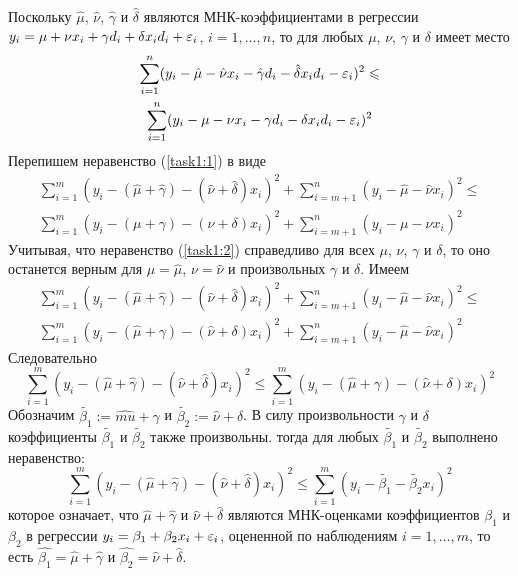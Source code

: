 \documentclass[pdftex,11pt,openany]{book}\usepackage[]{graphicx}\usepackage[]{color}
\begin{document}
\begin{solution}
Поскольку $\hat{\mu}$, $\hat{\nu}$, $\hat{\gamma}$ и $\hat{\delta}$ являются МНК-коэффициентами в регрессии $y_i = \mu + \nu x_i + \gamma d_i + \delta x_i d_i + \varepsilon_i$, $i = 1, \ldots, n$, то для любых $\mu$, $\nu$, $\gamma$ и $\delta$ имеет место
\begin{multline}
\label{task1:1}\sum_{i=1}^n (y_i - \hat{\mu} - \hat{\nu} x_i - \hat{\gamma} d_i - \hat{\delta} x_i d_i - \varepsilon_i)^2 \leqslant \\
\sum_{i=1}^n (y_i - \mu - \nu x_i - \gamma d_i - \delta x_i d_i - \varepsilon_i)^2
\end{multline}
Перепишем неравенство (\ref{task1:1}) в виде
\begin{multline}
\label{task1:2}\sum_{i=1}^m (y_i - (\hat{\mu} + \hat{\gamma}) - (\hat{\nu} + \hat{\delta}) x_i)^2 + \sum_{i= m + 1}^n (y_i - \hat{\mu} - \hat{\nu} x_i)^2 \leqslant \\
\sum_{i=1}^m (y_i - ({\mu} + {\gamma}) - ({\nu} + {\delta}) x_i)^2 + \sum_{i= m + 1}^n (y_i - {\mu} - {\nu} x_i)^2
\end{multline}
Учитывая, что неравенство (\ref{task1:2}) справедливо для всех $\mu$, $\nu$, $\gamma$ и $\delta$, то оно останется верным для $\mu = \hat{\mu}$, $\nu = \hat{\nu}$ и произвольных $\gamma$ и $\delta$. Имеем
\begin{multline}
\sum_{i=1}^m (y_i - (\hat{\mu} + \hat{\gamma}) - (\hat{\nu} + \hat{\delta}) x_i)^2 + \sum_{i= m + 1}^n (y_i - \hat{\mu} - \hat{\nu} x_i)^2 \leqslant \\
 \sum_{i=1}^m (y_i - (\hat{\mu} + {\gamma}) - (\hat{\nu} + {\delta}) x_i)^2 + \sum_{i= m + 1}^n (y_i - \hat{\mu} - \hat{\nu} x_i)^2
\end{multline}
Следовательно 
\begin{equation}
\sum_{i=1}^m (y_i - (\hat{\mu} + \hat{\gamma}) - (\hat{\nu} + \hat{\delta}) x_i)^2 \leqslant \sum_{i=1}^m (y_i - (\hat{\mu} + {\gamma}) - (\hat{\nu} + {\delta}) x_i)^2
\end{equation}
Обозначим $\tilde{\beta_1} := \hat{mu} + \gamma$ и $\tilde{\beta_2} := \hat{\nu} + \delta$. В силу произвольности $\gamma$ и $\delta$ коэффициенты $\tilde{\beta_1}$ и $\tilde{\beta_2}$ также произвольны. тогда для любых $\tilde{\beta_1}$ и $\tilde{\beta_2}$ выполнено неравенство:
$$\sum_{i=1}^m (y_i - (\hat{\mu} + \hat{\gamma}) - (\hat{\nu} + \hat{\delta}) x_i)^2 \leqslant \sum_{i=1}^m (y_i - \tilde{\beta_1} - \tilde{\beta_2} x_i)^2$$
которое означает, что $\hat{\mu} + \hat{\gamma}$ и $\hat{\nu} + \hat{\delta}$ являются МНК-оценками коэффициентов $\beta_1$ и $\beta_2$ в регрессии $y_i = \beta_1 + \beta_2 x_i + \varepsilon_i$, оцененной по наблюдениям $i = 1, \ldots, m$, то есть $\hat{\beta_1} = \hat{\mu} + \hat{\gamma}$ и $\hat{\beta_2} = \hat{\nu} + \hat{\delta}$.
\end{solution}
\end{document}
